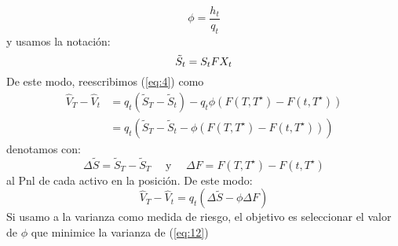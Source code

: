 \documentclass[12pt]{article}
\begin{document}
\begin{equation}
    \phi = \frac{h_t}{q_t}
    \label{eq:8}
\end{equation}
y usamos la notación:
\begin{equation}
    \Tilde{S}_t = S_tFX_t
    \label{eq:9}
\end{equation}
De este modo, reescribimos (\ref{eq:4}) como
\begin{equation}
    \begin{split}
            \hat{V}_T - \hat{V}_t  & = q_t\left(\tilde{S}_T - \tilde{S}_t\right) - q_t\phi\left(F(T, T^\star) - F(t, T^\star)\right) \\
            & = q_t\left(\tilde{S}_T - \tilde{S}_t - \phi\left(F(T, T^\star) - F(t, T^\star)\right)\right)
    \end{split}
    \label{eq:10}
\end{equation}
denotamos con:
\begin{equation}
    \Delta \tilde{S} = \tilde{S}_T - \tilde{S}_T \quad \text{ y } \quad \Delta F = F(T, T^\star) - F(t, T^\star)
    \label{eq:11}
\end{equation}
al Pnl de cada activo en la posición. De este modo:
\begin{equation}
    \hat{V}_T - \hat{V}_t = q_t\left(\Delta\tilde{S} - \phi\Delta F\right)
    \label{eq:12}
\end{equation}
Si usamo a la varianza como medida de riesgo, el objetivo es seleccionar el valor de $\phi$ que minimice la varianza de (\ref{eq:12})
\end{document}

